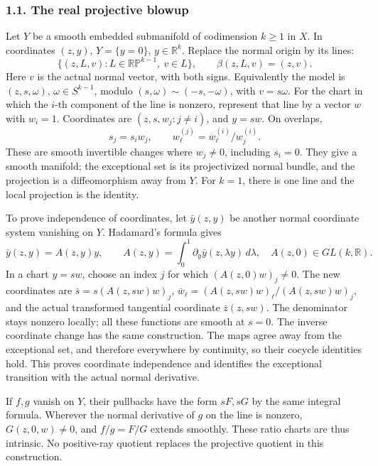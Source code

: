 \documentclass[
  11pt,
]{article}
\begin{document}
\subsubsection{1.1. The real projective
blowup}\label{the-real-projective-blowup}

Let \(Y\) be a smooth embedded submanifold of codimension \(k\ge1\) in
\(X\). In coordinates \((z,y)\), \(Y=\{y=0\}\), \(y\in\mathbb R^k\).
Replace the normal origin by its lines: \[
 \{(z,L,v):L\in\mathbb{RP}^{k-1},\ v\in L\},
 \qquad \beta(z,L,v)=(z,v).
 \tag{GL1}
\] Here \(v\) is the actual normal vector, with both signs. Equivalently
the model is \((z,s,\omega)\), \(\omega\in S^{k-1}\), modulo
\((s,\omega)\sim(-s,-\omega)\), with \(v=s\omega\). For the chart in
which the \(i\)-th component of the line is nonzero, represent that line
by a vector \(w\) with \(w_i=1\). Coordinates are \((z,s,w_j:j\ne i)\),
and \(y=s w\). On overlaps, \[
 s_j=s_i w_j,\qquad w_\ell^{(j)}=w_\ell^{(i)}/w_j^{(i)} .
 \tag{GL2}
\] These are smooth invertible changes where \(w_j\ne0\), including
\(s_i=0\). They give a smooth manifold; the exceptional set is its
projectivized normal bundle, and the projection is a diffeomorphism away
from \(Y\). For \(k=1\), there is one line and the local projection is
the identity.

To prove independence of coordinates, let \(\bar y(z,y)\) be another
normal coordinate system vanishing on \(Y\). Hadamard's formula gives \[
 \bar y(z,y)=A(z,y)y,\qquad
 A(z,y)=\int_0^1\partial_y\bar y(z,\lambda y)\,d\lambda ,
 \quad A(z,0)\in GL(k,\mathbb R).
 \tag{GL3}
\] In a chart \(y=s w\), choose an index \(j\) for which
\((A(z,0)w)_j\ne0\). The new coordinates are \(\bar s=s(A(z,s w)w)_j\),
\(\bar w_\ell=(A(z,s w)w)_\ell/(A(z,s w)w)_j\), and the actual
transformed tangential coordinate \(\bar z(z,s w)\). The denominator
stays nonzero locally; all these functions are smooth at \(s=0\). The
inverse coordinate change has the same construction. The maps agree away
from the exceptional set, and therefore everywhere by continuity, so
their cocycle identities hold. This proves coordinate independence and
identifies the exceptional transition with the actual normal derivative.

If \(f,g\) vanish on \(Y\), their pullbacks have the form \(sF,sG\) by
the same integral formula. Wherever the normal derivative of \(g\) on
the line is nonzero, \(G(z,0,w)\ne0\), and \(f/g=F/G\) extends smoothly.
These ratio charts are thus intrinsic. No positive-ray quotient replaces
the projective quotient in this construction.
\end{document}
